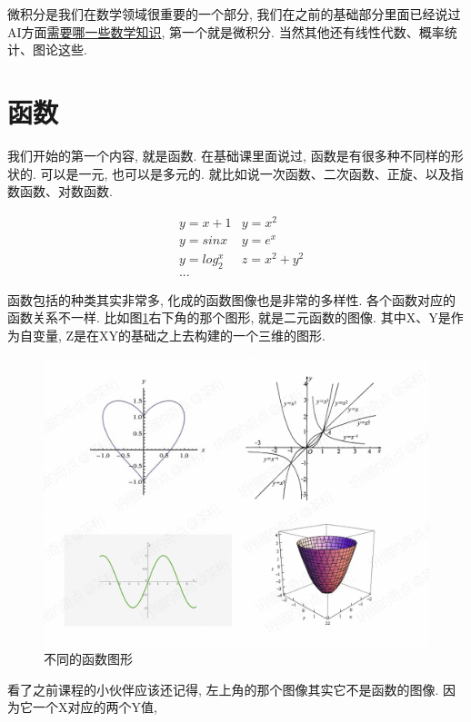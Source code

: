 微积分是我们在数学领域很重要的一个部分, 我们在之前的基础部分里面已经说过AI方面\hyperlink{数学如何运用于AI}{需要哪一些数学知识}, 第一个就是微积分. 当然其他还有线性代数、概率统计、图论这些. 

\hypertarget{6.微积分-函数}{}
\section{函数}

我们开始的第一个内容, 就是函数. 在基础课里面说过, 函数是有很多种不同样的形状的. 可以是一元, 也可以是多元的. 就比如说一次函数、二次函数、正旋、以及指数函数、对数函数. 

\begin{align*}
  & y = x + 1 & y = x^2 \\
  & y = sinx & y = e^x \\  
  & y = log_2^x & z = x^2 + y^2 \\ 
  & ...
\end{align*}

函数包括的种类其实非常多, 化成的函数图像也是非常的多样性. 各个函数对应的函数关系不一样. 比如图\ref{fig:img7_1}右下角的那个图形, 就是二元函数的图像. 其中X、Y是作为自变量, Z是在XY的基础之上去构建的一个三维的图形. 

\begin{figure}[ht]
  \centering
  \includegraphics[width=1\textwidth]{asset/0c36f8c5-0b4f-4fc1-a5dc-a206fd7e2db2.png}
  \caption{不同的函数图形}
  \label{fig:img7_1}
\end{figure}

看了之前课程的小伙伴应该还记得, 左上角的那个图像其实它不是函数的图像. 因为它一个X对应的两个Y值, 

